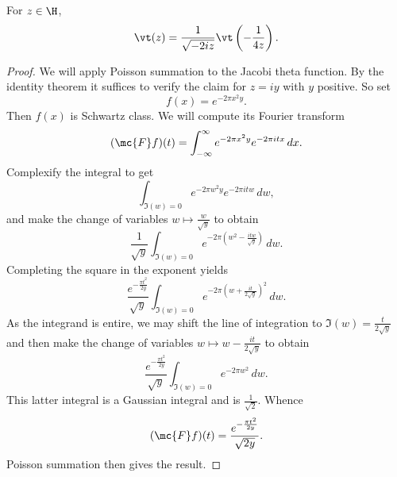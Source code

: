 \documentclass[12pt]{article}
\begin{document}
      \begin{theorem}\label{thm:functional_equation_Jacobi_theta}
        For \(z \in \H\),
        \[
          \vt(z) = \frac{1}{\sqrt{-2iz}}\vt\left(-\frac{1}{4z}\right).
        \]
      \end{theorem}
      \begin{proof}
        We will apply Poisson summation to the Jacobi theta function. By the identity theorem it suffices to verify the claim for \(z = iy\) with \(y\) positive. So set
        \[
          f(x) = e^{-2\pi x^{2}y}.
        \]
        Then \(f(x)\) is Schwartz class. We will compute its Fourier transform
        \[
          (\mc{F}f)(t) = \int_{-\infty}^{\infty}e^{-2\pi x^{2}y}e^{-2\pi itx}\,dx.
        \]
        Complexify the integral to get
        \[
          \int_{\Im(w) = 0}e^{-2\pi w^{2}y}e^{-2\pi itw}\,dw,
        \]
        and make the change of variables \(w \mapsto \frac{w}{\sqrt{y}}\) to obtain
        \[
          \frac{1}{\sqrt{y}}\int_{\Im(w) = 0}e^{-2\pi\left(w^{2}-\frac{itw}{\sqrt{y}}\right)}\,dw.
        \]
        Completing the square in the exponent yields
        \[
          \frac{e^{-\frac{\pi t^{2}}{2y}}}{\sqrt{y}}\int_{\Im(w) = 0}e^{-2\pi\left(w+\frac{it}{2\sqrt{y}}\right)^{2}}\,dw.
        \]
        As the integrand is entire, we may shift the line of integration to \(\Im(w) = \frac{t}{2\sqrt{y}}\) and then make the change of variables \(w \mapsto w-\frac{it}{2\sqrt{y}}\) to obtain
        \[
          \frac{e^{-\frac{\pi t^{2}}{2y}}}{\sqrt{y}}\int_{\Im(w) = 0}e^{-2\pi w^{2}}\,dw.
        \]
        This latter integral is a Gaussian integral and is \(\frac{1}{\sqrt{2}}\). Whence
        \[
          (\mc{F}f)(t) = \frac{e^{-\frac{\pi t^{2}}{2y}}}{\sqrt{2y}}.
        \]
        Poisson summation then gives the result.
      \end{proof}
\end{document}
